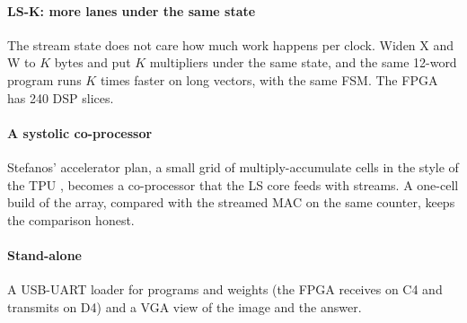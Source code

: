 \paragraph{LS-K: more lanes under the same state} The stream state does not care how much work happens per clock. Widen X and W to $K$ bytes and put $K$ multipliers under the same  state, and the same 12-word program runs $K$ times faster on long vectors, with the same FSM. The FPGA has 240 DSP slices.

\paragraph{A systolic co-processor} Stefanos' accelerator plan, a small grid of multiply-accumulate cells in the style of the TPU \citep{kung1982systolic,jouppi2017tpu}, becomes a co-processor that the LS core feeds with streams. A one-cell build of the array, compared with the streamed MAC on the same counter, keeps the comparison honest.

\paragraph{Stand-alone} A USB-UART loader for programs and weights (the FPGA receives on C4 and transmits on D4) and a VGA view of the image and the answer.
